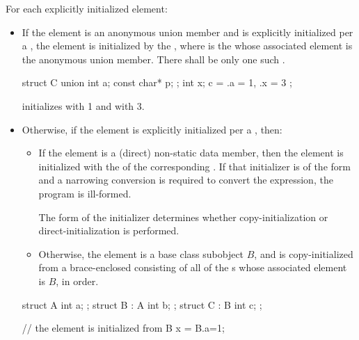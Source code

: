 \pnum
For each explicitly initialized element:
\begin{itemize}
\item
If the element is an anonymous union member and
is explicitly initialized per a ,
the element is initialized by the
 \tcode{\{ }\tcode{ \}},
where  is the 
whose associated element is the anonymous union member.
There shall be only one such .
\begin{example}
\begin{codeblock}
struct C {
  union {
    int a;
    const char* p;
  };
  int x;
} c = { .a = 1, .x = 3 };
\end{codeblock}
initializes  with 1 and  with 3.
\end{example}
\item
Otherwise, if the element is explicitly initialized
per a , then:
\begin{itemize}
\item
If the element is a (direct) non-static data member, then
the element is initialized with the 
of the corresponding .
If that initializer is of the form
\tcode{= }
and
a narrowing conversion is required
to convert the expression, the program is ill-formed.
\begin{note}
The form of the initializer determines
whether copy-initialization or direct-initialization is performed.
\end{note}
\item
Otherwise, the element is a base class subobject $B$, and
is copy-initialized from
a brace-enclosed 
consisting of all of the s
whose associated element is $B$, in order.
\end{itemize}
\begin{example}
\begin{codeblock}
struct A { int a; };
struct B : A { int b; };
struct C : B { int c; };

// the  element is initialized from 
B x = B{.a=1};


\end{codeblock}
\end{example}
\end{itemize}

